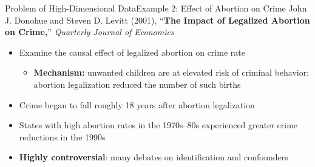 \documentclass[dvipsnames,hyperref={pdfpagelabels=false}]{beamer}
\begin{document}
	
	\begin{frame}{Problem of High-Dimensional Data}{Example 2: Effect of Abortion on Crime}
    John J. Donohue and Steven D. Levitt (2001), ``\textbf{The Impact of 
    Legalized Abortion on Crime,}'' \textit{Quarterly Journal of Economics}
        \vspace{0.2cm}
    \begin{itemize}
        \item Examine the causal effect of legalized abortion on crime rate
        \vspace{0.2cm}
        \begin{itemize}
            \item \textbf{Mechanism:} unwanted children are at elevated 
            risk of criminal behavior; abortion legalization reduced 
            the number of such births
        \end{itemize}
        \vspace{0.2cm}
        \item Crime began to fall roughly 18 years after abortion 
        legalization 
        \vspace{0.2cm}
        \item States with high abortion rates in the 1970s--80s 
        experienced greater crime reductions in the 1990s
        \vspace{0.2cm}
        \item \textbf{Highly controversial}: many debates on 
        identification and confounders
    \end{itemize}
\end{frame}
\end{document}
